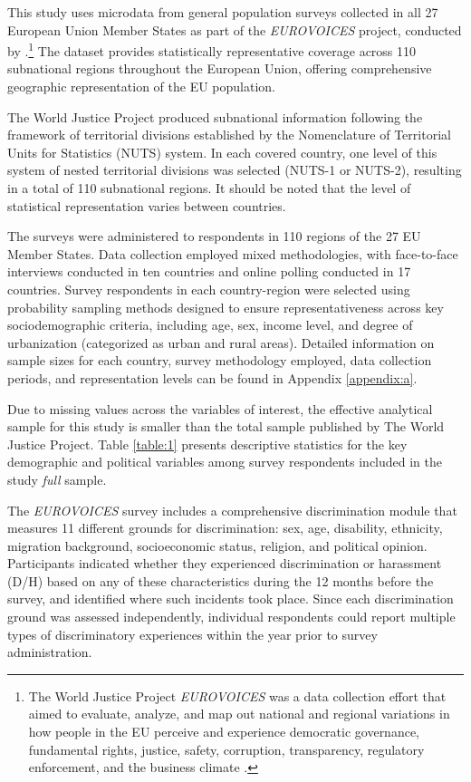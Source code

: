 \documentclass{article}
\begin{document}
This study uses microdata from general population surveys collected in all 27 European Union Member States as part of the \emph{EUROVOICES} project, conducted by \textcite{the_world_justice_project}.\footnote{The World Justice Project \emph{EUROVOICES} was a data collection effort that aimed to evaluate, analyze, and map out national and regional variations in how people in the EU perceive and experience democratic governance, fundamental rights, justice, safety, corruption, transparency, regulatory enforcement, and the business climate \parencite{the_world_justice_project}.} The dataset provides statistically representative coverage across 110 subnational regions throughout the European Union, offering comprehensive geographic representation of the EU population.

The World Justice Project produced subnational information following the framework of territorial divisions established by the Nomenclature of Territorial Units for Statistics (NUTS) system. In each covered country, one level of this system of nested territorial divisions was selected (NUTS-1 or NUTS-2), resulting in a total of 110 subnational regions. It should be noted that the level of statistical representation varies between countries.

The surveys were administered to respondents in 110 regions of the 27 EU Member States. Data collection employed mixed methodologies, with face-to-face interviews conducted in ten countries and online polling conducted in 17 countries. Survey respondents in each country-region were selected using probability sampling methods designed to ensure representativeness across key sociodemographic criteria, including age, sex, income level, and degree of urbanization (categorized as urban and rural areas). Detailed information on sample sizes for each country, survey methodology employed, data collection periods, and representation levels can be found in Appendix \ref{appendix:a}.

Due to missing values across the variables of interest, the effective analytical sample for this study is smaller than the total sample published by The World Justice Project. Table \ref{table:1} presents descriptive statistics for the key demographic and political variables among survey respondents included in the study \emph{full} sample.



The \emph{EUROVOICES} survey includes a comprehensive discrimination module that measures 11 different grounds for discrimination: sex, age, disability, ethnicity, migration background, socioeconomic status, religion, and political opinion. Participants indicated whether they experienced discrimination or harassment (D/H) based on any of these characteristics during the 12 months before the survey, and identified where such incidents took place. Since each discrimination ground was assessed independently, individual respondents could report multiple types of discriminatory experiences within the year prior to survey administration.
\end{document}
